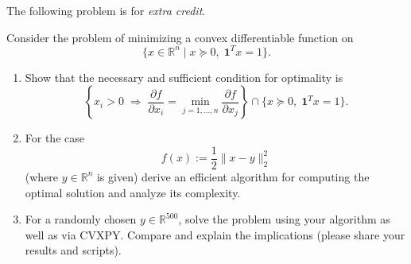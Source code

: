 \documentclass[11pt,letter,notitlepage]{article}
\theoremstyle{definition}
\begin{document}
\newpage
\begin{exercise}
The following problem is for \textit{extra credit}.

Consider the problem of minimizing a convex differentiable function on
\[
\{x \in \mathbb{R}^n \mid x \succeq 0,\; \mathbf{1}^T x = 1\}.
\]

\begin{enumerate}[label=(\alph*)]
    \item Show that the necessary and sufficient condition for optimality is
    \[
    \left\{
    x_i > 0 \;\Longrightarrow\;
    \frac{\partial f}{\partial x_i}
    =
    \min_{j=1,\dots,n}\frac{\partial f}{\partial x_j}
    \right\}
    \cap
    \{x \succeq 0,\; \mathbf{1}^T x = 1\}.
    \]

    \item For the case
    \[
    f(x) := \frac{1}{2}\|x-y\|_2^2
    \]
    (where $y \in \mathbb{R}^n$ is given) derive an efficient algorithm for computing the optimal
    solution and analyze its complexity.

    \item For a randomly chosen $y \in \mathbb{R}^{500}$, solve the problem using your algorithm as
    well as via CVXPY. Compare and explain the implications (please share your results and scripts).
\end{enumerate}
\end{exercise}

\newpage
\end{document}
